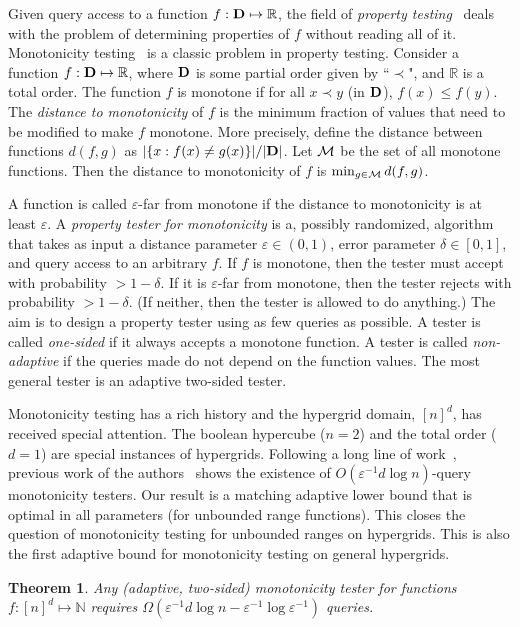 \documentclass[11pt]{article}
\newtheorem{theorem}{Theorem}[section]
\def\eps{\varepsilon}
\def\R{{\mathbb R}}
\newcommand{\cM}{{\cal M}}
\newcommand{\NN}{\mathbb{N}}
\begin{document}
Given query access to a function $f: \D \mapsto \R$, the field of \emph{property testing}~\cite{RS96,GGR98} deals
with the problem of determining properties of $f$ without reading all of it.
Monotonicity testing~\cite{GGLRS00} is a classic problem in property testing. Consider a function $f: \D \mapsto \R$,
where ${\mathbf D}$ is some partial order given by ``$\prec$", and $\R$ is a total order. The function $f$ is monotone
if for all $x \prec y$ (in ${\mathbf D}$), $f(x) \leq f(y)$. The \emph{distance to monotonicity} of $f$ is the minimum
fraction of values that need to be modified to make $f$ monotone. More precisely, define the distance between functions
$d(f,g)$ as $|\{x: f(x) \neq g(x)\}|/|{\mathbf D}|$. Let $\cM$ be the set of all monotone functions.
Then the distance to monotonicity of $f$ is $\min_{g \in \cM} d(f,g)$.

A function is called $\eps$-far from monotone if the distance to monotonicity is at least $\eps$.
A \emph{property tester for monotonicity} is a, possibly randomized, algorithm that takes as input a distance parameter $\eps \in (0,1)$, error parameter $\delta \in [0,1]$, 
and query access to an arbitrary $f$. If $f$ is monotone, then the tester must accept with probability $>1-\delta$.
If it is $\eps$-far from monotone, then the tester rejects with probability $>1-\delta$. (If neither, then the tester
is allowed to do anything.) The aim is to design a property tester using as few queries as possible.
A tester is called \emph{one-sided} if it always accepts a monotone function. A tester is called \emph{non-adaptive}
if the queries made do not depend on the function values. The most general tester is an adaptive two-sided tester.

Monotonicity testing has a rich history and the hypergrid domain, $[n]^d$, has received special attention.
The boolean hypercube ($n=2$) and the total order ($d=1$) are special instances of hypergrids.
Following a long line of work~\cite{EKK+00, GGLRS00,DGLRRS99,LR01,FLNRRS02,AC04,E04,HK04,PRR04,ACCL04,BRW05,BBM11}, 
previous work of the authors~\cite{ChSe13} shows the existence of $O(\eps^{-1} d\log n)$-query
monotonicity testers. Our result is a matching adaptive lower bound that is optimal in all parameters
(for unbounded range functions).
This closes the
question of monotonicity testing for unbounded ranges on hypergrids.
This is also the first adaptive bound for monotonicity testing on general hypergrids.

\begin{theorem} \label{thm:main}
Any (adaptive, two-sided) monotonicity tester for functions $f:[n]^d \mapsto \NN$ requires $\Omega(\eps^{-1} d\log n - \eps^{-1}\log \eps^{-1})$ queries.
\end{theorem}
\end{document}
